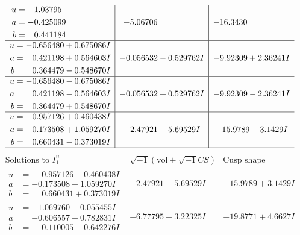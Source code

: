 \documentclass[1p]{elsarticle_modified}
\theoremstyle{definition}
\newcommand{\I}{\sqrt{-1}}
\begin{document}
$$\begin{array}{c|c|c}
\begin{aligned}
u &= \phantom{-}1.03795\phantom{ +0.000000I} \\
a &= -0.425099\phantom{ +0.000000I} \\
b &= \phantom{-}0.441184\phantom{ +0.000000I}\end{aligned}
 & -5.06706\phantom{ +0.000000I} & -16.3430\phantom{ +0.000000I} \\ \hline\begin{aligned}
u &= -0.656480 + 0.675086 I \\
a &= \phantom{-}0.421198 + 0.564603 I \\
b &= \phantom{-}0.364479 - 0.548670 I\end{aligned}
 & -0.056532 - 0.529762 I & -9.92309 + 2.36241 I \\ \hline\begin{aligned}
u &= -0.656480 - 0.675086 I \\
a &= \phantom{-}0.421198 - 0.564603 I \\
b &= \phantom{-}0.364479 + 0.548670 I\end{aligned}
 & -0.056532 + 0.529762 I & -9.92309 - 2.36241 I \\ \hline\begin{aligned}
u &= \phantom{-}0.957126 + 0.460438 I \\
a &= -0.173508 + 1.059270 I \\
b &= \phantom{-}0.660431 - 0.373019 I\end{aligned}
 & -2.47921 + 5.69529 I & -15.9789 - 3.1429 I\\
 \hline 
 \end{array}$$\newpage$$\begin{array}{c|c|c}  
\text{Solutions to }I^u_{1}& \I (\text{vol} + \sqrt{-1}CS) & \text{Cusp shape}\\
 \hline 
\begin{aligned}
u &= \phantom{-}0.957126 - 0.460438 I \\
a &= -0.173508 - 1.059270 I \\
b &= \phantom{-}0.660431 + 0.373019 I\end{aligned}
 & -2.47921 - 5.69529 I & -15.9789 + 3.1429 I \\ \hline\begin{aligned}
u &= -1.069760 + 0.055455 I \\
a &= -0.606557 - 0.782831 I \\
b &= \phantom{-}0.110005 - 0.642276 I\end{aligned}
 & -6.77795 - 3.22325 I & -19.8771 + 4.6627 I \\ \hline\begin{aligned}

\end{aligned}
\end{array}$$
\end{document}
